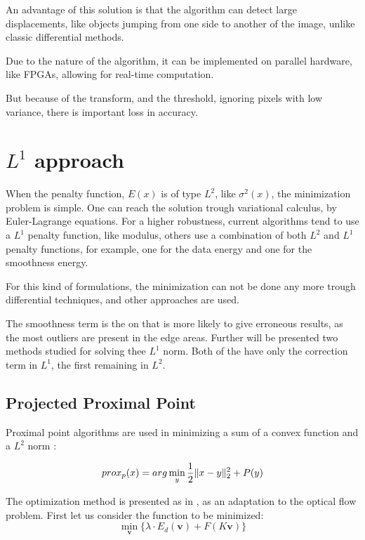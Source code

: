 \documentclass[12pt,a4paper,twoside]{report}
\begin{document}
{An advantage of this solution is that the algorithm can detect large displacements, like objects jumping from one side to another of the image, unlike classic differential methods. 

Due to the nature of the algorithm, it can be implemented on parallel hardware, like FPGAs, allowing for real-time computation. 


But because of the transform, and the threshold, ignoring pixels with low variance, there is important loss in accuracy.



\section{$L^1$ approach}

When the penalty function, $E(x)$ is of type $L^2$, like $\sigma^2(x)$,  the minimization problem is simple. One can reach the solution trough variational calculus, by Euler-Lagrange equations.  
For a higher robustness, current algorithms tend to use a $L^1$ penalty function, like modulus, others use a combination of both $L^2$ and $L^1$ penalty functions, for example, one for the data energy and one for the smoothness energy.

For this kind of formulations, the minimization can not be done any more trough differential techniques, and other approaches are used.

The smoothness term is the on that is more likely to give erroneous results, as the most outliers are present in the edge areas. Further will be presented two methods studied for solving thee $L^1$ norm. Both of the have only the correction term in $L^1$, the first remaining in $L^2$.

\subsection{Projected Proximal Point}
Proximal point algorithms are used in minimizing a sum of a convex function and a $L^2$ norm \cite{parikh2013proximal}:

$$prox_p(x) = arg \min_y \frac{1}{2}\Arrowvert x - y\Arrowvert_2^2 + P(y) $$

The optimization method is presented as in \cite{drulea2013}, as an adaptation to the optical flow problem. First let us consider the function to be minimized:
$$ \min_{\boldsymbol{v}} \{\lambda \cdot E_d(\boldsymbol{v})+F(K\boldsymbol{v})\}$$

}
\end{document}
